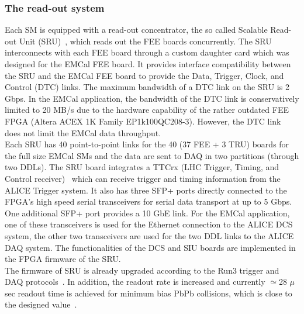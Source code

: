 \subsubsection{The read-out system}
Each SM is equipped with a read-out concentrator, the so called Scalable Read-out Unit (SRU)~\cite{Zhang:2014ioa}, which reads out the FEE boards concurrently.
The SRU interconnects with each FEE board through a custom daughter card which was designed for the EMCal FEE board. It provides interface compatibility between the SRU and the EMCal FEE board to provide the Data, Trigger, Clock, and Control (DTC) links. 
The maximum bandwidth of a DTC link on the SRU is 2 Gbps. In the EMCal application, the bandwidth of the DTC link is conservatively limited to 20 MB/s due to the hardware capability of the rather outdated FEE FPGA (Altera ACEX 1K Family EP1k100QC208-3). However, the DTC link does not limit the EMCal data throughput.\\
%
Each SRU has 40 point-to-point links for the 40 (37 FEE + 3 TRU) boards for the full size EMCal SMs and the data are sent to DAQ in two partitions (through two DDLs). 
The SRU board integrates a TTCrx (LHC Trigger, Timing, and Control receiver)~\cite{Christiansen:1996dg} which can receive trigger and timing information from the ALICE Trigger system. It also has three SFP+ ports directly connected to the FPGA’s high speed serial transceivers for serial data transport at up to 5 Gbps. One additional SFP+ port provides a 10 GbE link. For the EMCal application, one of these transceivers is used for the Ethernet connection to the ALICE DCS system, the other two transceivers are used for the two DDL links to the ALICE DAQ system. The functionalities of the DCS and SIU boards are implemented in the FPGA firmware of the SRU.\\
%
The firmware of SRU is already upgraded according to the Run3 trigger and DAQ protocols~\cite{Antonioli:2013ppp}. In addition, the readout rate is increased
and currently $\simeq$28 $\mu$sec readout time is achieved for minimum bias PbPb collisions, which is close to the designed value~\cite{Zhang:2014ioa}.
%
